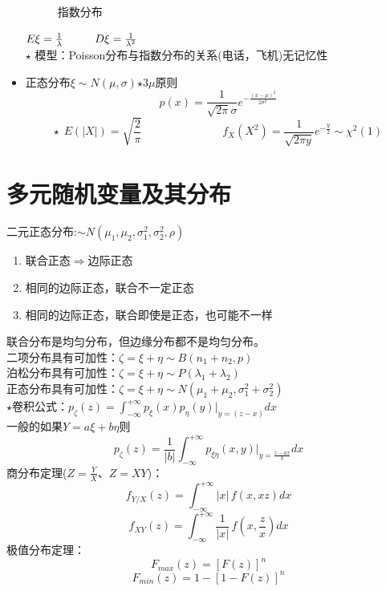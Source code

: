 \documentclass{article}
\begin{document}
\begin{itemize}
\begin{figure}[H]
\begin{center}
        \caption{指数分布}
    \end{center}
\end{figure}
$E\xi =\frac{1}{\lambda} \hspace*{1cm} D\xi =\frac{1}{\lambda ^2}$\\
{\color{red}$\star$ 模型：Poisson分布与指数分布的关系(电话，飞机)\hspace{1cm}无记忆性}
    \item 正态分布\hspace*{0.5cm}$\xi\sim N(\mu,\sigma )$\hspace*{1cm}$\star$3$\mu$原则
    \[p(x)= \frac{1}{\sqrt{2\pi}\sigma}e^{-\frac{{(x-\mu)}^2}{2\sigma^2}} \]
    {\color{red}\[\star \hspace{5pt}E(|X|)=\sqrt{\frac{2}{\pi}}\hspace{3cm}f_X(X^2)=\frac{1}{\sqrt{2\pi y}}e^{-\frac{y}{2}} \sim \chi ^2(1)\]}
\end{itemize}
\clearpage


\section*{\center\Huge 多元随机变量及其分布}

\noindent 二元正态分布:\hspace*{0.5cm}$\sim N(\mu_1,\mu_2,\sigma_1^2,\sigma_2^2,\rho)$
    \begin{enumerate}
        \item 联合正态$\Longrightarrow$边际正态
        \item 相同的边际正态，联合不一定正态
        \item 相同的边际正态，联合即使是正态，也可能不一样
    \end{enumerate}
    联合分布是均匀分布，但边缘分布都不是均匀分布。\\
    二项分布具有可加性：$\zeta =\xi +\eta \sim B(n_1+n_2,p)$\\
    泊松分布具有可加性：$\zeta =\xi +\eta \sim P(\lambda_1+\lambda_2)$\\
    正态分布具有可加性：$\zeta =\xi +\eta \sim N(\mu_1+\mu_2,\sigma_1^2+\sigma_2^2)$\\
    $\star$卷积公式：$p_\zeta(z)=\int_{-\infty}^{+\infty}p_\xi(x)p_\eta(y)|_{y=(z-x)}dx$\\
    一般的如果$Y =a\xi +b\eta $则
    \[p_{\zeta}(z)=\frac{1}{|b|}\int_{-\infty}^{+\infty}p_{\xi \eta}(x,y)|_{y=\frac{z-ax}{b}}dx\]
    商分布定理($Z=\frac{Y}{X}$、$Z=XY$)：
    \[f_{Y/X}(z)=\int_{-\infty}^{+\infty}|x|\hspace{2pt}f(x,xz)dx\]
    \[f_{XY}(z)=\int_{-\infty}^{+\infty}\frac{1}{|x|}\hspace{2pt}f(x,\frac{z}{x})dx\]
    极值分布定理：
    \[F_{max}(z)={[F(z)]}^n\]
    \[F_{min}(z)=1-{[1-F(z)]}^n\]
\end{document}
